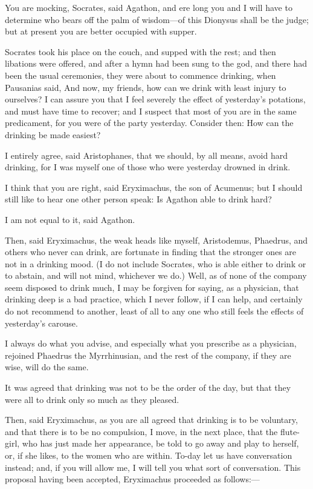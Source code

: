 \para[35] You are mocking, Socrates, said Agathon, and ere long you and I will have to determine who bears off the palm of wisdom---of this Dionysus shall be the judge; but at present you are better occupied with supper.

\para[36] Socrates took his place on the couch, and supped with the rest; and then libations were offered, and after a hymn had been sung to the god, and there had been the usual ceremonies, they were about to commence drinking, when Pausanias said, And now, my friends, how can we drink with least injury to ourselves? I can assure you that I feel severely the effect of yesterday's potations, and must have time to recover; and I suspect that most of you are in the same predicament, for you were of the party yesterday. Consider then: How can the drinking be made easiest?

\para[37] I entirely agree, said Aristophanes, that we should, by all means, avoid hard drinking, for I was myself one of those who were yesterday drowned in drink.

\para[38] I think that you are right, said Eryximachus, the son of Acumenus; but I should still like to hear one other person speak: Is Agathon able to drink hard?

\para[39] I am not equal to it, said Agathon.

\para[40] Then, said Eryximachus, the weak heads like myself, Aristodemus, Phaedrus, and others who never can drink, are fortunate in finding that the stronger ones are not in a drinking mood. (I do not include Socrates, who is able either to drink or to abstain, and will not mind, whichever we do.) Well, as of none of the company seem disposed to drink much, I may be forgiven for saying, as a physician, that drinking deep is a bad practice, which I never follow, if I can help, and certainly do not recommend to another, least of all to any one who still feels the effects of yesterday's carouse.

\para[41] I always do what you advise, and especially what you prescribe as a physician, rejoined Phaedrus the Myrrhinusian, and the rest of the company, if they are wise, will do the same.

\para[42] It was agreed that drinking was not to be the order of the day, but that they were all to drink only so much as they pleased.

\para[43] Then, said Eryximachus, as you are all agreed that drinking is to be voluntary, and that there is to be no compulsion, I move, in the next place, that the flute-girl, who has just made her appearance, be told to go away and play to herself, or, if she likes, to the women who are within. To-day let us have conversation instead; and, if you will allow me, I will tell you what sort of conversation. This proposal having been accepted, Eryximachus proceeded as follows:---

